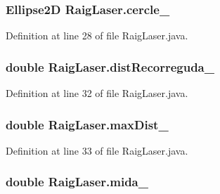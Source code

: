 \subsubsection[{cercle\+\_\+}]{\setlength{\rightskip}{0pt plus 5cm}Ellipse2\+D Raig\+Laser.\+cercle\+\_\+\hspace{0.3cm}{\ttfamily [private]}}\label{class_raig_laser_a6dcd860c4c10753459396a1172285e4a}


Definition at line 28 of file Raig\+Laser.\+java.

\hypertarget{class_raig_laser_aa0abe5fa3762a4e65133e1ae227b1cc9}{}
\subsubsection[{dist\+Recorreguda\+\_\+}]{\setlength{\rightskip}{0pt plus 5cm}double Raig\+Laser.\+dist\+Recorreguda\+\_\+\hspace{0.3cm}{\ttfamily [private]}}\label{class_raig_laser_aa0abe5fa3762a4e65133e1ae227b1cc9}


Definition at line 32 of file Raig\+Laser.\+java.

\hypertarget{class_raig_laser_af0f554292aa21db0721ed27ef67f81dc}{}
\subsubsection[{max\+Dist\+\_\+}]{\setlength{\rightskip}{0pt plus 5cm}double Raig\+Laser.\+max\+Dist\+\_\+\hspace{0.3cm}{\ttfamily [private]}}\label{class_raig_laser_af0f554292aa21db0721ed27ef67f81dc}


Definition at line 33 of file Raig\+Laser.\+java.

\hypertarget{class_raig_laser_a1a7bafcac85edd40992edd71450168de}{}
\subsubsection[{mida\+\_\+}]{\setlength{\rightskip}{0pt plus 5cm}double Raig\+Laser.\+mida\+\_\+\hspace{0.3cm}{\ttfamily [private]}}\label{class_raig_laser_a1a7bafcac85edd40992edd71450168de}


